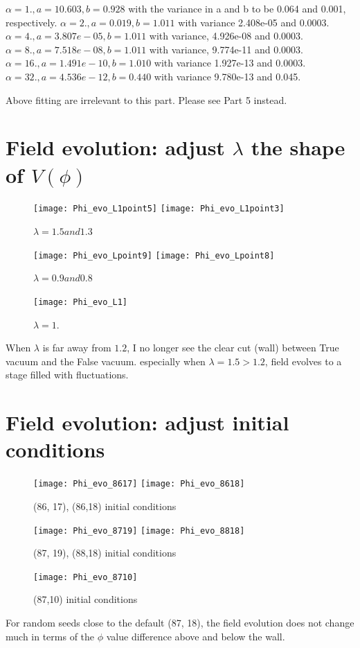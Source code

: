 \documentclass{article}
\begin{document}
$\alpha=1., a =  10.603, b =  0.928$ with the variance in a and b to be 0.064 and 0.001, respectively. $\alpha=2., a = 0.019, b =  1.011$ with variance 2.408e-05 and 0.0003. $\alpha=4., a = 3.807e-05, b =  1.011$ with variance, 4.926e-08 and 0.0003. $\alpha=8., a = 7.518e-08, b =  1.011$ with variance, 9.774e-11 and 0.0003. $\alpha=16., a = 1.491e-10, b =  1.010$ with variance 1.927e-13 and 0.0003. $\alpha=32., a = 4.536e-12, b =  0.440$ with variance 9.780e-13 and 0.045. 

\vspace{3mm}
Above fitting are irrelevant to this part. Please see Part 5 instead.



\section{Field evolution: adjust $\lambda$ the shape of $V(\phi)$}

\begin{figure}[H]
    \centering
    \texttt{[image: Phi\_evo\_L1point5]}
    \texttt{[image: Phi\_evo\_L1point3]}
    \caption{$\lambda=1.5 and 1.3$}
    \label{fig:Q1}
\end{figure}

\begin{figure}[H]
    \centering
    \texttt{[image: Phi\_evo\_Lpoint9]}
    \texttt{[image: Phi\_evo\_Lpoint8]}
    \caption{$\lambda=0.9 and 0.8$}
    \label{fig:Q1}
\end{figure}

\begin{figure}[H]
    \centering
    \texttt{[image: Phi\_evo\_L1]}
    \caption{$\lambda=1.$}
    \label{fig:Q1}
\end{figure}

When $\lambda$ is far away from $1.2$, I no longer see the clear cut (wall) between True vacuum and the False vacuum. especially when $\lambda=1.5>1.2$, field evolves to a stage filled with fluctuations.
\section{Field evolution: adjust initial conditions}

\begin{figure}[H]
    \centering
    \texttt{[image: Phi\_evo\_8617]}
    \texttt{[image: Phi\_evo\_8618]}
    \caption{(86, 17), (86,18) initial conditions}
    \label{fig:Q1}
\end{figure}


\begin{figure}[H]
    \centering
    \texttt{[image: Phi\_evo\_8719]}
    \texttt{[image: Phi\_evo\_8818]}
    \caption{(87, 19), (88,18) initial conditions}
    \label{fig:Q1}
\end{figure}

\begin{figure}[H]
    \centering
    \texttt{[image: Phi\_evo\_8710]}
    \caption{(87,10) initial conditions}
    \label{fig:Q1}
\end{figure}

For random seeds close to the default (87, 18), the field evolution does not change much in terms of the $\phi$ value difference above and below the wall.
\end{document}
